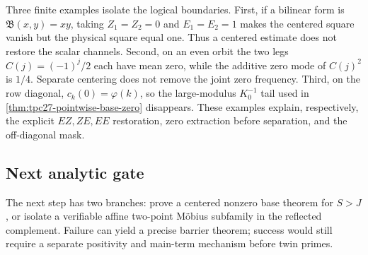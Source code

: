 Three finite examples isolate the logical boundaries.  First, if a
bilinear form is \(\mathfrak B(x,y)=xy\), taking
\(Z_1=Z_2=0\) and \(E_1=E_2=1\) makes the centered square vanish but
the physical square equal one.  Thus a centered estimate does not
restore the scalar channels.  Second, on an even orbit the two legs
\(C(j)=(-1)^j/2\) each have mean zero, while the additive zero mode of
\(C(j)^2\) is \(1/4\).  Separate centering does not remove the joint
zero frequency.  Third, on the row diagonal,
\(c_k(0)=\varphi(k)\), so the large-modulus \(K_0^{-1}\) tail used in
\cref{thm:tpc27-pointwise-base-zero} disappears.  These examples
explain, respectively, the explicit \(EZ,ZE,EE\) restoration, zero
extraction before separation, and the off-diagonal mask.

\subsection{Next analytic gate}

The next step has two branches: prove a centered nonzero base theorem
for \(S>J\), or isolate a verifiable affine two-point M\"obius subfamily
in the reflected complement.  Failure can yield a precise barrier
theorem; success would still require a separate positivity and
main-term mechanism before twin primes.

